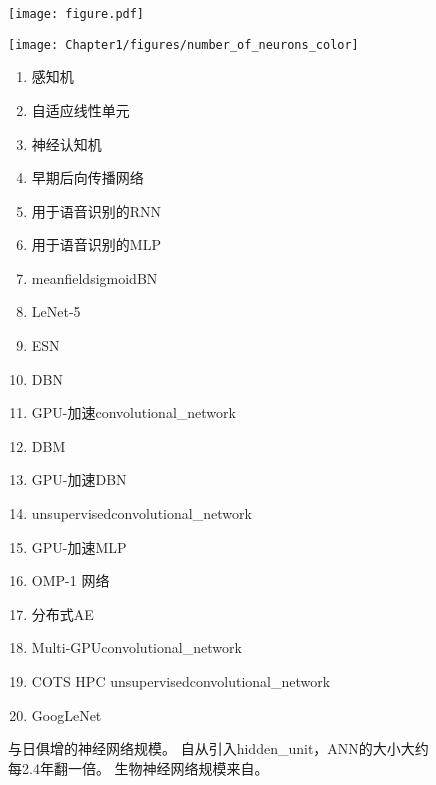\begin{figure}[!htb]
\ifOpenSource
\centerline{\texttt{[image: figure.pdf]}}
\else
\centerline{\texttt{[image: Chapter1/figures/number\_of\_neurons\_color]}}
\fi
\caption{与日俱增的神经网络规模。
自从引入\gls{hidden_unit}，\gls{ANN}的大小大约每2.4年翻一倍。
生物神经网络规模来自\citet{number_of_neurons}。
}
\label{fig:chap1_number_of_neurons_color}
{\tiny
\begin{enumerate}
  \itemsep-.1em
  \item %
    感知机~\citep{Rosenblatt-1958,Rosenblatt62}
  \item %
    自适应线性单元~\citep{Widrow60}
  \item %
    神经认知机~\citep{Fukushima80}
  \item %
    早期后向传播网络~\citep{Rumelhart86c}
  \item %
    用于语音识别的\gls{RNN}~\citep{Robinson+Fallside91}
  \item %
    用于语音识别的\gls{MLP}~\citep{Bengio91z}
  \item %
    \gls{meanfield}sigmoid\gls{BN}~\citep{Saul+96}
  \item %
    LeNet-5~\citep{LeCun98-small}
  \item %
    \gls{ESN}~\citep{Jaeger+Haas-2004}
  \item %
    \gls{DBN}~\citep{Hinton06}
  \item %
    GPU-加速\gls{convolutional_network}~\citep{chellapilla:inria-00112631}
  \item %
    \gls{DBM}~\citep{SalHinton09}
  \item %
    GPU-加速\gls{DBN}~\citep{RainaICML09}
  \item %
    \gls{unsupervised}\gls{convolutional_network}~\citep{Jarrett-ICCV2009-small}
  \item %
    GPU-加速\gls{MLP}~\citep{Ciresan-2010}
  \item %
    OMP-1 网络~\citep{Coates2011b}
  \item %
    分布式\gls{AE}~\citep{QuocLe-ICML2012}
  \item %
    Multi-GPU\gls{convolutional_network}~\citep{Krizhevsky-2012-small}
  \item %
    COTS HPC \gls{unsupervised}\gls{convolutional_network}~\citep{icml2013_coates13}
  \item %
    GoogLeNet~\citep{Szegedy-et-al-arxiv2014}
\end{enumerate}
}
\end{figure}


